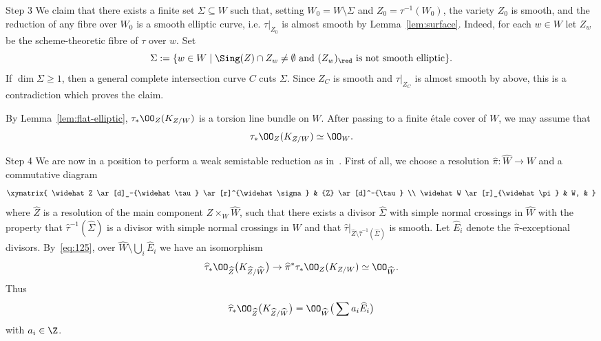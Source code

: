 \begin{proofc}
\begin{step}{Step 3}
We claim that there exists a finite set $\Sigma \subseteq W$ such that, setting $W_0 = W \setminus \Sigma$ and $Z_0 = \tau^{-1}(W_0)$, the variety $Z_0$ is smooth, and the reduction of any fibre over $W_0$ is a smooth elliptic curve, i.e. $\tau|_{Z_0}$ is almost smooth by Lemma~\ref{lem:surface}. Indeed, for each $w\in W$ let $Z_w$ be the scheme-theoretic fibre of $\tau$ over $w$. Set
\[
\Sigma:=\{w\in W\mid \Sing(Z)\cap Z_w\neq\emptyset\text{ and }(Z_w)_{\red} \text{ is not smooth elliptic}\}.
\]
If $\dim \Sigma\geq1$, then a general complete intersection curve $C$ cuts $\Sigma$. Since $Z_C$ is smooth and $\tau|_{Z_C}$ is almost smooth by above, this is a contradiction which proves the claim.

By Lemma~\ref{lem:flat-elliptic}, $\tau_*\OO_{Z}(K_{Z/W})$ is a torsion line bundle on $W$. After passing to a finite étale cover of $W$, we may assume that
\begin{equation}\label{eq:125}
\tau_*\OO_{Z}(K_{Z/W}) \simeq \OO_{W}.
\end{equation}
\end{step}

\begin{step}{Step 4}
We are now in a position to perform a weak semistable reduction as in~\cite[Definition~6.7 and Lemma~6.8]{Vi95}. First of all, we choose a resolution $\widehat \pi \colon \widehat W \to W $ and a commutative diagram
\[
\xymatrix{
\widehat Z \ar[d]_-{\widehat \tau} \ar[r]^{\widehat \sigma} & {Z} \ar[d]^-{\tau} \\
\widehat W \ar[r]_{\widehat \pi} & W, & }
\]
where $\widehat Z$ is a resolution of the main component $Z \times_{W} \widehat W$, such that there exists a divisor $\widehat \Sigma$ with simple normal crossings in $\widehat W$ with the property that $\widehat \tau^{-1}(\widehat \Sigma)$ is a divisor with simple normal crossings in $\widehat W$ and that $\widehat \tau|_{\widehat{Z}\setminus\widehat\tau^{-1}(\widehat{\Sigma})}$ is smooth. Let $\widehat E_i$ denote the $\widehat \pi$-exceptional divisors. By~\eqref{eq:125}, over $\widehat W \setminus \bigcup_i \widehat E_i$ we have an isomorphism
\[
\widehat \tau_*\OO_{\widehat Z}\big(K_{\widehat Z / \widehat W}\big) \to \widehat \pi^* \tau_* \OO_Z(K_{Z/W}) \simeq \OO_{\widehat W}.
\]
Thus
\begin{equation}\label{eq:int}
\widehat \tau_*\OO_{\widehat Z}\big(K_{\widehat Z/ \widehat W}\big) = \OO_{\widehat W}\big(\sum a_i \widehat E_i\big)
\end{equation}
with $a_i \in \Z$.


\end{step}
\end{proofc}
